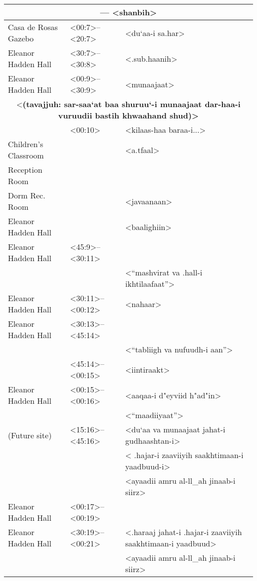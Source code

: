 \documentclass[12pt]{arabart}
\begin{document}
\begin{longtable}[c]{p{1.75in}|p{1.1in}|p{2.75in}}
\multicolumn{3}{c}{ --- <shanbih>} \\
\hline
Casa de Rosas Gazebo & <00:7>--<20:7> & \hfill <du`aa-i sa.har> \\
Eleanor Hadden Hall & <30:7>--<30:8> & \hfill <.sub.haanih> \\
Eleanor Hadden Hall & <00:9>--<30:9> & \hfill <munaajaat> \vspace{1.5ex} \\
\multicolumn{3}{c}{<\bf (tavajjuh: sar-saa`at baa shuruu`-i munaajaat dar-haa-i vuruudii bastih khwaahand shud)>} \vspace{1.5ex} \\
 & <00:10> & \hfill <kilaas-haa baraa-i...> \\
Children's Classroom & & \hfill <a.tfaal> \\
Reception Room & &  \\
Dorm Rec. Room & & \hfill <javaanaan> \\
Eleanor Hadden Hall & & \hfill <baalighiin> \vspace{1.5ex} \\
Eleanor Hadden Hall & <45:9>--<30:11> &  \\
 & & \hfill <``mashvirat va .hall-i ikhtilaafaat''> \vspace{1.5ex} \\
Eleanor Hadden Hall & <30:11>--<00:12> & \hfill <nahaar> \vspace{1.5ex} \\
Eleanor Hadden Hall & <30:13>--<45:14> &  \\
 & & \hfill <``tabliigh va nufuudh-i aan''> \vspace{1.5ex} \\
 & <45:14>--<00:15> & \hfill <iintiraakt> \vspace{1.5ex} \\
Eleanor Hadden Hall & <00:15>--<00:16> & \hfill <aaqaa-i d"eyviid h"ad"in> \\
 & & \hfill <``maadiiyaat''> \vspace{1.5ex} \\
(Future site) & <15:16>--<45:16> & \hfill <du`aa va munaajaat jahat-i gudhaashtan-i> \\
 & & \hfill < .hajar-i zaaviiyih saakhtimaan-i yaadbuud-i> \\
 & & \hfill <ayaadii amru al-ll_ah jinaab-i siirz> \vspace{1.5ex} \\
Eleanor Hadden Hall & <00:17>--<00:19> &  \vspace{1.5ex} \\
Eleanor Hadden Hall & <30:19>--<00:21> & \hfill <.haraaj jahat-i .hajar-i zaaviiyih saakhtimaan-i yaadbuud> \\
 & & \hfill <ayaadii amru al-ll_ah jinaab-i siirz> \\
\hline
\end{longtable}
\end{document}

